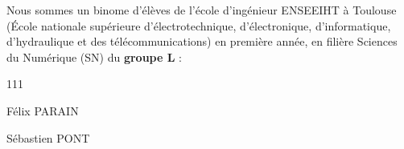Nous sommes un binome d'élèves de l'école d'ingénieur ENSEEIHT à Toulouse 
(École nationale supérieure d'électrotechnique, d'électronique, d'informatique, d'hydraulique 
et des télécommunications) en première année, en filière Sciences du Numérique (SN) du \textbf{groupe L} :
\\
\begin{dinglist}{111}
   \item Félix PARAIN
   \item Sébastien PONT
\end{dinglist}
